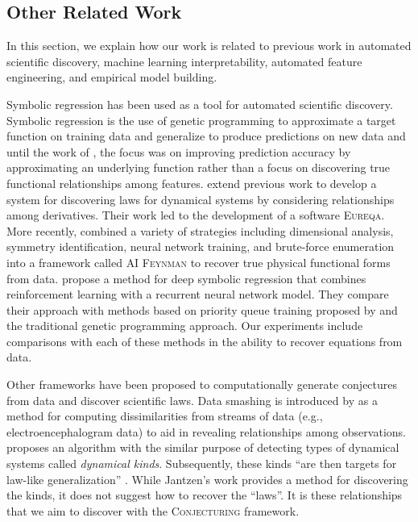 \documentclass[ijds,nonblindrev]{informs-ijds}
\begin{document}


\subsection{Other Related Work}
In this section, we explain how our work is related to previous work in automated scientific discovery, machine learning interpretability, automated feature engineering, and empirical model building.   

Symbolic regression has been used as a tool for automated scientific discovery.  Symbolic regression is the use of genetic programming to approximate a target function on training data and generalize to produce predictions on new data \citep{NicolauAgapitos20} and until the work of \citet{SchmLips09}, the focus was on improving prediction accuracy by approximating an underlying function rather than a focus on discovering true functional relationships among features.  \cite{SchmLips09} extend previous work to develop a system for discovering laws for dynamical systems by considering relationships among derivatives.  Their work led to the development of a software \textsc{Eureqa}.  More recently, \cite{UdrescuTegmark20} combined a variety of strategies including dimensional analysis, symmetry identification, neural network training, and  brute-force enumeration into a framework called \textsc{AI Feynman} to recover true physical functional forms from data. \citet{petersen} propose a method for deep symbolic regression that combines reinforcement learning with a recurrent neural network model.  They compare their approach with methods based on priority queue training proposed by \citep{abolafia} and the traditional genetic programming approach.  Our experiments include comparisons with each of these methods in the ability to recover equations from data.


Other frameworks have been proposed to computationally generate conjectures from data and discover scientific laws.  Data smashing is introduced by  \cite{ChattopadhyayLipson14} as a method for computing dissimilarities from streams of data (e.g., electroencephalogram data) to aid in revealing relationships among observations.  \cite{Jantzen16} proposes an algorithm with the similar purpose of detecting types of dynamical systems called {\it dynamical kinds}.  Subsequently, these kinds ``are then targets for law-like generalization'' \citep{Jantzen16}.  While Jantzen's work provides a method for discovering the kinds, it does not suggest how to recover the ``laws''.  It is these relationships that we aim to discover with the \textsc{Conjecturing} framework.  
\end{document}
